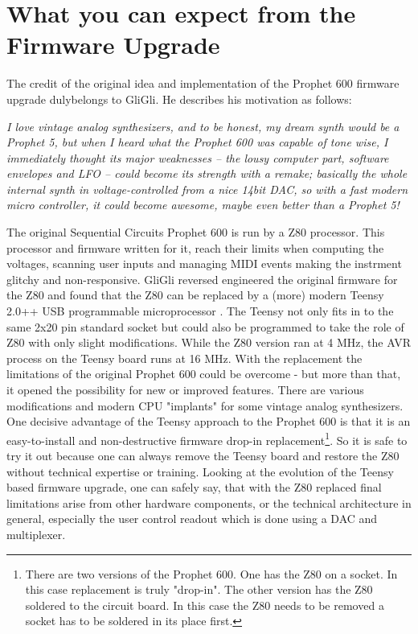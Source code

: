 \documentclass[landscape, 11pt, oneside]{report}
\newenvironment{flowtext}{\addmargin[0cm]{7cm}}{\endaddmargin} %
\begin{document}
\begin{flowtext}

\section{What you can expect from the Firmware Upgrade}

The credit of the original idea and implementation of the Prophet 600 firmware upgrade dulybelongs to GliGli\cite{gligli}. He describes his motivation as follows:

\begin{addmargin}[2cm]{1cm}

\textit{I love vintage analog synthesizers, and to be honest, my dream synth would be a Prophet 5, but when I heard what the Prophet 600 was capable of tone wise, I immediately thought its major weaknesses -- the lousy computer part, software envelopes and LFO -- could become its strength with a remake; basically the whole internal synth in voltage-controlled from a nice 14bit DAC, so with a fast modern micro controller, it could become awesome, maybe even better than a Prophet 5!}

\end{addmargin}

The original Sequential Circuits Prophet 600 is run by a Z80 processor. This processor and firmware written for it, reach their limits when computing the voltages, scanning user inputs and managing MIDI events making the instrment glitchy and non-responsive. GliGli reversed engineered the original firmware for the Z80 and found that the Z80 can be replaced by a (more) modern Teensy 2.0++ USB programmable microprocessor \cite{teensy}. The Teensy not only fits in to the same 2x20 pin standard socket but could also be programmed to take the role of Z80 with only slight modifications. While the Z80 version ran at 4 MHz, the AVR process on the Teensy board runs at 16 MHz. With the replacement the  limitations of the original Prophet 600 could be overcome - but more than that, it opened the possibility for new or improved features.   There are various modifications and modern CPU "implants" for some vintage analog synthesizers. One decisive advantage of the Teensy approach to the Prophet 600 is that it is an easy-to-install and non-destructive firmware drop-in replacement\footnote{There are two versions of the Prophet 600. One has the Z80 on a socket. In this case replacement is truly "drop-in". The other version has the Z80 soldered to the circuit board. In this case the Z80 needs to be removed a socket has to be soldered in its place first.}. So it is safe to try it out because one can always remove the Teensy board and restore the Z80 without technical expertise or training. Looking at the evolution of the Teensy based firmware upgrade, one can safely say, that with the Z80 replaced final limitations arise from other hardware components, or the technical architecture in general, especially the user control readout which is done using a DAC and multiplexer. 


\end{flowtext}
\end{document}
